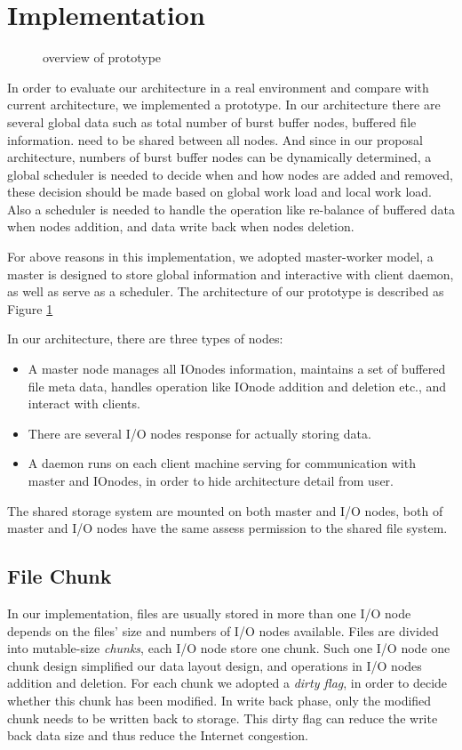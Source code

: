 \section{Implementation}
\label{sec:implementation}
\begin{figure}
\centering
\caption{overview of prototype}
\label{overview of prototype}
\end{figure}

In order to evaluate our architecture in a real environment and compare with current architecture, we implemented a prototype. 
In our architecture there are several global data such as total number of burst buffer nodes,
buffered file information. need to be shared between all nodes.
And since in our proposal architecture, numbers of burst buffer nodes can be dynamically determined,
a global scheduler is needed to decide when and how nodes are added and removed, these decision should be made based on global work load and local work load.
Also a scheduler is needed to handle the operation like re-balance of buffered data when nodes addition, and data write back when nodes deletion.

For above reasons in this implementation, we adopted master-worker model, a master is designed to store global information and interactive with client daemon, as well as serve as a scheduler.
The architecture of our prototype is described as Figure \ref{overview of prototype}

In our architecture, there are three types of nodes:
\begin{itemize}
	\item A master node manages all IOnodes information, maintains a set of buffered file meta data, handles operation like IOnode addition and deletion etc., and interact with clients.
	\item There are several I/O nodes response for actually storing data.
	\item A daemon runs on each client machine serving for communication with
	master and IOnodes, in order to hide architecture detail from user.
\end{itemize}

The shared storage system are mounted on both master and I/O nodes, both of master and I/O nodes have the same assess permission to the shared file system.

\subsection{File Chunk}
In our implementation, files are usually stored in more than one I/O node depends on the files' size and numbers of I/O nodes available.
Files are divided into mutable-size \emph{chunks}, each I/O node store one chunk.
Such one I/O node one chunk design simplified our data layout design, and operations in I/O nodes addition and deletion.
For each chunk we adopted a \emph{dirty flag}, in order to decide whether this chunk has been modified.
In write back phase, only the modified chunk needs to be written back to storage.
This dirty flag can reduce the write back data size and thus reduce the Internet congestion.

